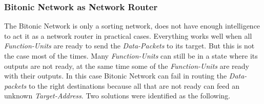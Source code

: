 			\subsubsection{Bitonic Network as Network Router}
				  The Bitonic Network is only a sorting network, does not have enough intelligence to act it as a network router in practical cases. Everything works well when all \textit{Function-Units} 
				  are ready to send the \textit{Data-Packets} to its target. But this is not the case most of the times. Many \textit{Function-Units} can still be in a state where its outputs are not ready,
				  at the same time some of the \textit{Function-Units} are ready with their outputs. In this case Bitonic Network can fail in routing the \textit{Data-packets} to the right destinations because all
				  that are not ready can feed an unknown \textit{Target-Address}. Two solutions were identified as the following.
